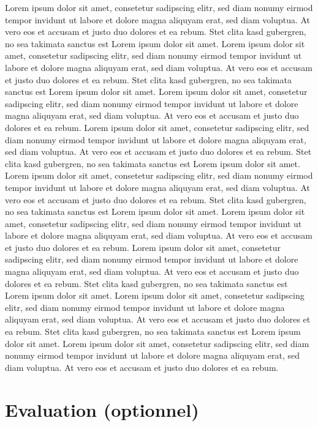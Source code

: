 \documentclass[preprint,journal]{vgtc}       %
\begin{document}
Lorem ipsum dolor sit amet, consetetur sadipscing elitr, sed diam
nonumy eirmod tempor invidunt ut labore et dolore magna aliquyam erat,
sed diam voluptua. At vero eos et accusam et justo duo dolores et ea
rebum. Stet clita kasd gubergren, no sea takimata sanctus est Lorem
ipsum dolor sit amet. Lorem ipsum dolor sit amet, consetetur
sadipscing elitr, sed diam nonumy eirmod tempor invidunt ut labore et
dolore magna aliquyam erat, sed diam voluptua. At vero eos et accusam
et justo duo dolores et ea rebum. Stet clita kasd gubergren, no sea
takimata sanctus est Lorem ipsum dolor sit amet. Lorem ipsum dolor sit
amet, consetetur sadipscing elitr, sed diam nonumy eirmod tempor
invidunt ut labore et dolore magna aliquyam erat, sed diam
voluptua. At vero eos et accusam et justo duo dolores et ea
rebum.
Lorem ipsum dolor sit amet, consetetur sadipscing elitr, sed diam
nonumy eirmod tempor invidunt ut labore et dolore magna aliquyam erat,
sed diam voluptua. At vero eos et accusam et justo duo dolores et ea
rebum. Stet clita kasd gubergren, no sea takimata sanctus est Lorem
ipsum dolor sit amet. Lorem ipsum dolor sit amet, consetetur
sadipscing elitr, sed diam nonumy eirmod tempor invidunt ut labore et
dolore magna aliquyam erat, sed diam voluptua. At vero eos et accusam
et justo duo dolores et ea rebum. Stet clita kasd gubergren, no sea
takimata sanctus est Lorem ipsum dolor sit amet. Lorem ipsum dolor sit
amet, consetetur sadipscing elitr, sed diam nonumy eirmod tempor
invidunt ut labore et dolore magna aliquyam erat, sed diam
voluptua. At vero eos et accusam et justo duo dolores et ea
rebum.
Lorem ipsum dolor sit amet, consetetur sadipscing elitr, sed diam
nonumy eirmod tempor invidunt ut labore et dolore magna aliquyam erat,
sed diam voluptua. At vero eos et accusam et justo duo dolores et ea
rebum. Stet clita kasd gubergren, no sea takimata sanctus est Lorem
ipsum dolor sit amet. Lorem ipsum dolor sit amet, consetetur
sadipscing elitr, sed diam nonumy eirmod tempor invidunt ut labore et
dolore magna aliquyam erat, sed diam voluptua. At vero eos et accusam
et justo duo dolores et ea rebum. Stet clita kasd gubergren, no sea
takimata sanctus est Lorem ipsum dolor sit amet. Lorem ipsum dolor sit
amet, consetetur sadipscing elitr, sed diam nonumy eirmod tempor
invidunt ut labore et dolore magna aliquyam erat, sed diam
voluptua. At vero eos et accusam et justo duo dolores et ea
rebum.

\section{Evaluation (optionnel)}
\end{document}
